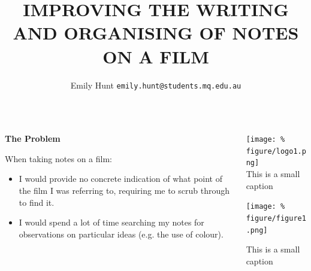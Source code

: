 \documentclass[unknownkeysallowed,usepdftitle=false, parskip=full]{beamer}
\title{IMPROVING THE WRITING AND ORGANISING OF NOTES ON A FILM}
\author{Emily Hunt \texttt{emily.hunt@students.mq.edu.au}}
\newcommand{\secvariable}{nothing}
\newcommand{\mysection}[1]{\renewcommand{\secvariable}{#1}
}
\begin{document}
\mysection{abstract}
\begin{frame}\label{\secvariable}

 \begin{columns}[t]
  
      \begin{column}[c]{0.45\textwidth}
    \parbox{\linewidth}{
    
    \textbf{The Problem}

\vspace{1pt}

      When taking notes on a film:  
      
      \vspace{1pt}
      
      \begin{itemize}
          \item I would provide no concrete indication of what point of the film I was referring to, requiring me to scrub through to find it.
      \end{itemize}
      \begin{itemize}
          \item I would spend a lot of time searching my notes for observations on particular ideas (e.g. the use of colour).
      \end{itemize}
      }
    \end{column}
  
  \begin{column}[c]{0.45\textwidth}
\texttt{[image: \%
figure/logo1.png]}\\
\tiny{This is a small caption}

\vspace{20pt}
\texttt{[image: \%
figure/figure1.png]}

\tiny{This is a small caption}
    \end{column}
    
  \end{columns}

  

   
\end{frame}
\end{document}
